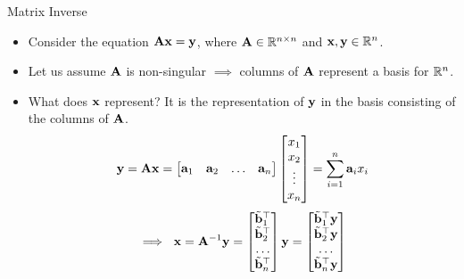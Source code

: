 \documentclass[aspectratio=169]{beamer}
\let\olditem\item
\renewcommand{\item}{\setlength{\itemsep}{\fill}\olditem}
\def\mf{\ensuremath\mathbf}
\def\mb{\ensuremath\mathbb}
\begin{document}
\begin{frame}[t]{Matrix Inverse}
\begin{itemize}
    \item Consider the equation $\mf{Ax} = \mf{y}$, where $\mf{A} \in \mb{R}^{n \times n}$ and $\mf{x}, \mf{y} \in \mb{R}^n$. 

    \item Let us assume $\mf{A}$ is non-singular $\implies$ columns of $\mf{A}$ represent a basis for $\mb{R}^n$.

    \item What does $\mf{x}$ represent? It is the representation of $\mf{y}$ in the basis consisting of the columns of $\mf{A}$.
    \[ \mf{y} = \mf{Ax} = \begin{bmatrix*}\mf{a}_1 & \mf{a}_2 & \ldots & \mf{a}_n\end{bmatrix*}\begin{bmatrix*}x_1 \\ x_2 \\ \vdots \\ x_n\end{bmatrix*} = \sum_{i=1}^{n}\mf{a}_i x_i\]
    \[ \implies \,\, \mf{x} = \mf{A}^{-1}\mf{y} = \begin{bmatrix*}\tilde{\mf{b}}_1^\top \\ \tilde{\mf{b}}_2^\top \\ \ldots \\ \tilde{\mf{b}}_n^\top\end{bmatrix*}\mf{y} = \begin{bmatrix*}\tilde{\mf{b}}_1^\top\mf{y} \\ \tilde{\mf{b}}_2^\top\mf{y} \\ \ldots \\ \tilde{\mf{b}}_n^\top\mf{y}\end{bmatrix*} \]
\end{itemize}
\end{frame}
\end{document}
